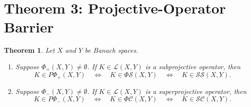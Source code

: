\documentclass[11pt]{article}
\newtheorem{theorem}{Theorem}
\newcommand{\LL}{\mathcal L}
\newcommand{\SSing}{\mathcal{SS}}
\newcommand{\SCos}{\mathcal{SC}}
\newcommand{\PhiS}{\Phi\mathcal S}
\newcommand{\PhiC}{\Phi\mathcal C}
\begin{document}
\section*{Theorem 3: Projective-Operator Barrier}

\begin{theorem}
Let \(X\) and \(Y\) be Banach spaces.
\begin{enumerate}
\item Suppose \(\Phi_+(X,Y)\neq\emptyset\).  If \(K\in\LL(X,Y)\) is a
subprojective operator, then
\[
K\in P\Phi_+(X,Y)\quad\Longleftrightarrow\quad
K\in\PhiS(X,Y)\quad\Longleftrightarrow\quad K\in\SSing(X,Y).
\]

\item Suppose \(\Phi_-(X,Y)\neq\emptyset\).  If \(K\in\LL(X,Y)\) is a
superprojective operator, then
\[
K\in P\Phi_-(X,Y)\quad\Longleftrightarrow\quad
K\in\PhiC(X,Y)\quad\Longleftrightarrow\quad K\in\SCos(X,Y).
\]
\end{enumerate}
\end{theorem}
\end{document}
